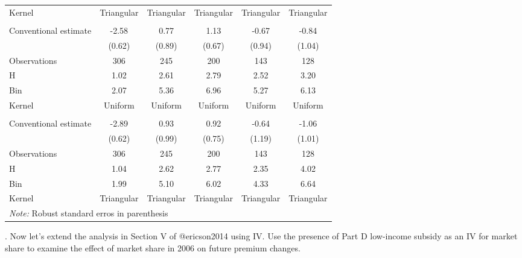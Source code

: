 \documentclass[
  12pt,
]{article}
\begin{document}
\begin{enumerate}
\begin{table}
\begin{tabular}[t]{lccccc}
  \hspace{1em}Kernel & Triangular & Triangular & Triangular & Triangular & \vphantom{1} Triangular\\
  \addlinespace[0.3em]
  \multicolumn{6}{l}{\textit{Panel B. Quadratic Polinomial}}\\
  \hspace{1em}Conventional estimate & -2.58 & 0.77 & 1.13 & -0.67 & -0.84\\
  \hspace{1em} & (0.62) & (0.89) & (0.67) & (0.94) & (1.04)\\
  \hspace{1em}Observations & 306 & 245 & 200 & 143 & \vphantom{1} 128\\
  \hspace{1em}H & 1.02 & 2.61 & 2.79 & 2.52 & 3.20\\
  \hspace{1em}Bin & 2.07 & 5.36 & 6.96 & 5.27 & 6.13\\
  \hspace{1em}Kernel & Uniform & Uniform & Uniform & Uniform & Uniform\\
  \\
  \hspace{1em}Conventional estimate & -2.89 & 0.93 & 0.92 & -0.64 & -1.06\\
  \hspace{1em} & (0.62) & (0.99) & (0.75) & (1.19) & (1.01)\\
  \hspace{1em}Observations & 306 & 245 & 200 & 143 & 128\\
  \hspace{1em}H & 1.04 & 2.62 & 2.77 & 2.35 & 4.02\\
  \hspace{1em}Bin & 1.99 & 5.10 & 6.02 & 4.33 & 6.64\\
  \hspace{1em}Kernel & Triangular & Triangular & Triangular & Triangular & Triangular\\
  \bottomrule
  \bottomrule
  \multicolumn{6}{l}{\textit{Note:} Robust standard erros in parenthesis}\\
  \end{tabular}
  \end{table}
\end{enumerate}


. Now let's extend the analysis in Section V of @ericson2014 using IV.
Use the presence of Part D low-income subsidy as an IV for market share
to examine the effect of market share in 2006 on future premium changes.
\end{document}
